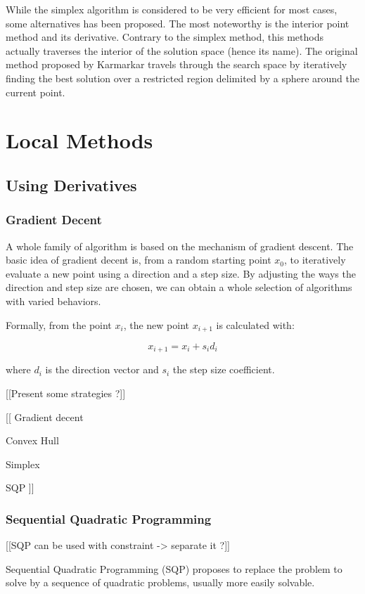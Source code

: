 While the simplex algorithm is considered to be very efficient for most cases, some alternatives has been proposed. The most noteworthy is the interior point method and its derivative. Contrary to the simplex method, this methods actually traverses the interior of the solution space (hence its name). The original method proposed by Karmarkar\cite{Karmarkar:1984:NPA:800057.808695} travels through the search space by iteratively finding the best solution over a restricted region delimited by a sphere around the current point.

\section{Local Methods}

\subsection{Using Derivatives}

\subsubsection{Gradient Decent}

A whole family of algorithm is based on the mechanism of gradient descent.
The basic idea of gradient decent is, from a random starting point $x_0$, to iteratively evaluate a new point using a direction and a step size.
By adjusting the ways the direction and step size are chosen, we can obtain a whole selection of algorithms with varied behaviors.

Formally, from the point $x_i$, the new point $x_{i+1}$ is calculated with:

\[ x_{i+1} = x_i +s_id_i \]

where $d_i$ is the direction vector and $s_i$ the step size coefficient.

[[Present some strategies ?]]


[[
Gradient decent

Convex Hull

Simplex

SQP
]]

\subsubsection{Sequential Quadratic Programming}
[[SQP can be used with constraint -> separate it ?]]

Sequential Quadratic Programming (SQP) proposes to replace the problem to solve by a sequence of quadratic problems, usually more easily solvable.

